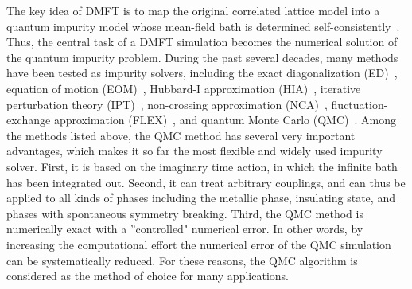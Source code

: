 The key idea of DMFT is to map the original correlated lattice model into a quantum impurity model whose mean-field bath is determined self-consistently~\cite{RevModPhys.68.13,RevModPhys.77.1027,RevModPhys.78.865}. Thus, the central task of a DMFT simulation becomes the numerical solution of the quantum impurity problem. During the past several decades, many methods have been tested as impurity solvers, including the exact diagonalization (ED)~\cite{PhysRevLett.72.1545}, equation of motion (EOM)~\cite{PhysRevB.50.7295}, Hubbard-I approximation (HIA)~\cite{PhysRevB.39.6962}, iterative perturbation theory (IPT)~\cite{PhysRevB.45.6479}, non-crossing approximation (NCA)~\cite{Grewe1983,Kuramoto1983,RevModPhys.59.845}, fluctuation-exchange approximation (FLEX)~\cite{Bickers1989206,PhysRevB.43.8044}, and quantum Monte Carlo (QMC)~\cite{PhysRevLett.56.2521,PhysRevLett.69.168}. Among the methods listed above, the QMC method has several very important advantages, which makes it so far the most flexible and widely used impurity solver. First, it is based on the imaginary time action, in which the infinite bath has been integrated out. Second, it can treat arbitrary couplings, and can thus be applied to all kinds of phases including the metallic phase, insulating state, and phases with spontaneous symmetry breaking. Third, the QMC method is numerically exact with a ''controlled" numerical error. In other words, by increasing the computational effort the numerical error of the QMC simulation can be systematically reduced. For these reasons, the QMC algorithm is considered as the method of choice for many applications.

